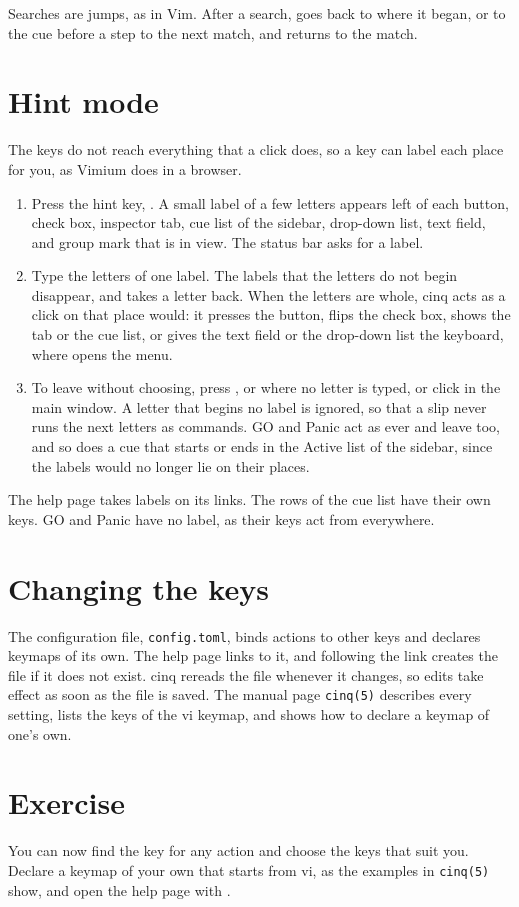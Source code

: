 Searches are jumps, as in Vim.  After a search,  goes back to
where it began, or to the cue before a step to the next match, and
 returns to the match.

\section{Hint mode}

The keys do not reach everything that a click does, so a key can label each
place for you, as Vimium does in a browser.

\begin{enumerate}
\item Press the hint key, .  A small label of a few
  letters appears left of each button, check box, inspector tab, cue list of
  the sidebar, drop-down list, text field, and group mark that is in view.
  The status bar asks for a label.
\item Type the letters of one label.  The labels that the letters do not begin
  disappear, and  takes a letter back.  When the letters are
  whole, cinq acts as a click on that place would: it presses the button,
  flips the check box, shows the tab or the cue list, or gives the text field
  or the drop-down list the keyboard, where  opens the menu.
\item To leave without choosing, press , or 
  where no letter is typed, or click in the main window.  A letter that begins
  no label is ignored, so that a slip never runs the next letters as commands.
  GO and Panic act as ever and leave too, and so does a cue that starts or ends
  in the Active list of the sidebar, since the labels would no longer lie on
  their places.
\end{enumerate}

The help page takes labels on its links.  The rows of the cue list have their
own keys.  GO and Panic have no label, as their keys act from everywhere.

\section{Changing the keys}

The configuration file, \texttt{config.toml}, binds actions to other keys and
declares keymaps of its own.  The help page links to it, and following the link
creates the file if it does not exist.  cinq rereads the file whenever it
changes, so edits take effect as soon as the file is saved.  The manual page
\texttt{cinq(5)} describes every setting, lists the keys of the vi keymap, and
shows how to declare a keymap of one's own.

\section*{Exercise}

You can now find the key for any action and choose the keys that suit you.
Declare a keymap of your own that starts from vi, as the examples in
\texttt{cinq(5)} show, and open the help page with .
